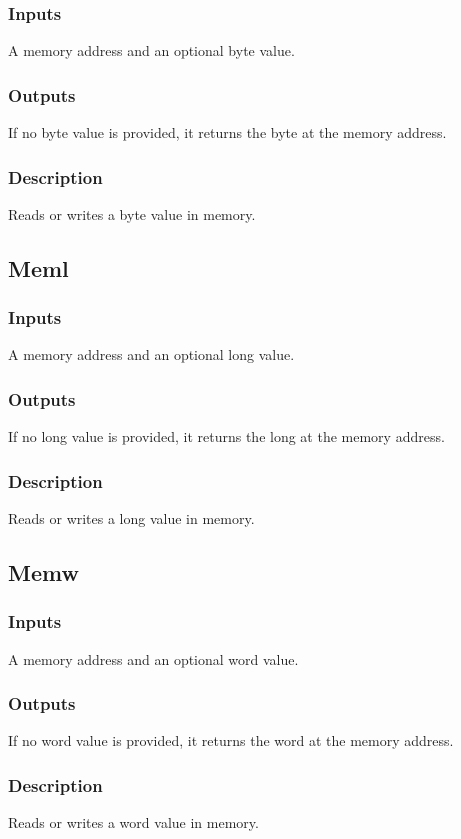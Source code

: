 \documentclass[10pt, openany]{book}
\begin{document}
\subsubsection{Inputs}
A memory address and an optional byte value.
\subsubsection{Outputs}
If no byte value is provided, it returns the byte at the memory address.
\subsubsection{Description}
Reads or writes a byte value in memory.

\subsection{Meml}
\subsubsection{Inputs}
A memory address and an optional long value.
\subsubsection{Outputs}
If no long value is provided, it returns the long at the memory address.
\subsubsection{Description}
Reads or writes a long value in memory.

\subsection{Memw}
\subsubsection{Inputs}
A memory address and an optional word value.
\subsubsection{Outputs}
If no word value is provided, it returns the word at the memory address.
\subsubsection{Description}
Reads or writes a word value in memory.
\end{document}
